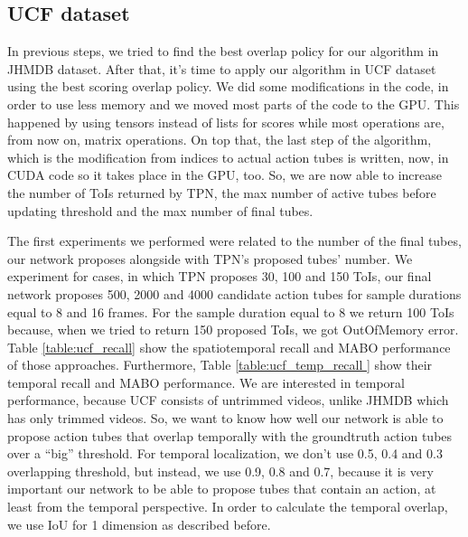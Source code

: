 \subsection{UCF dataset}
In previous steps, we tried to find the best overlap policy for our algorithm in JHMDB dataset. After that, it's time to apply our algorithm in UCF dataset using the best scoring
overlap policy. We did some modifications in the code, in order to use less memory and we moved most parts of the code to the GPU. This happened by using tensors instead of lists for scores while
most operations are, from now on, matrix operations. On top that, the last step of the algorithm, which is the modification from indices to actual action tubes is written, now, in CUDA code so
it takes place in the GPU, too. So, we are now able to increase the number of ToIs returned by TPN, the max number of active tubes before updating threshold and the max number of final
tubes. \par
The first experiments we performed were related to the number of the final tubes, our network proposes alongside with TPN's proposed
tubes' number. We experiment for cases, in which TPN proposes 30, 100 and 150 ToIs, our final network proposes 500, 2000 and 4000
candidate action tubes for sample durations equal to 8 and 16 frames.
For the sample duration equal to 8 we return 100 ToIs because, when we tried to return 150 proposed ToIs, we got OutOfMemory error.
Table \ref{table:ucf_recall} show the spatiotemporal recall and MABO performance of those approaches. Furthermore, Table \ref{table:ucf_temp_recall } show their temporal recall and MABO performance. We are interested in temporal performance, because UCF consists of
untrimmed videos, unlike JHMDB which has only trimmed videos. So, we want to know how well our network is able to propose action tubes that
overlap temporally with the groundtruth action tubes over a ``big'' threshold. For temporal localization, we don't use 0.5, 0.4 and 0.3
overlapping threshold, but instead, we use 0.9, 0.8 and 0.7, because it is very important our network to be able to propose tubes that
 contain an action, at least from the temporal perspective. In order to calculate the temporal overlap, we use IoU for 1 dimension as described before.

